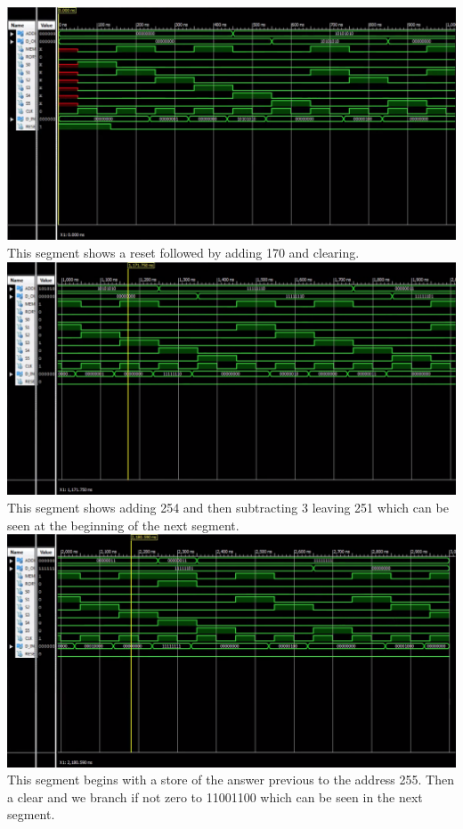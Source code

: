 \documentclass[12pt]{article}
\begin{document}
\begin{center}
	\includegraphics[scale=.35]{c1.png}\\
	This segment shows a reset followed by adding 170 and clearing.
	\includegraphics[scale=.35]{c2.png}\\
	This segment shows adding 254 and then subtracting 3 leaving 251 which can be seen at the beginning of the next segment.
	\includegraphics[scale=.35]{c3.png}\\
	This segment begins with a store of the answer previous to the address 255. Then a clear and we branch if not zero to 11001100 which can be seen in the next segment.

\end{center}
\end{document}
